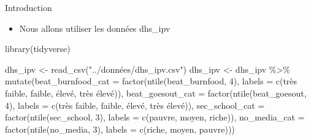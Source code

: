 \documentclass[
  ignorenonframetext,
]{beamer}
\newenvironment{Shaded}{\begin{snugshade}}{\end{snugshade}}
\newcommand{\AttributeTok}[1]{\textcolor[rgb]{0.77,0.63,0.00}{#1}}
\newcommand{\DecValTok}[1]{\textcolor[rgb]{0.00,0.00,0.81}{#1}}
\newcommand{\FunctionTok}[1]{\textcolor[rgb]{0.00,0.00,0.00}{#1}}
\newcommand{\NormalTok}[1]{#1}
\newcommand{\OtherTok}[1]{\textcolor[rgb]{0.56,0.35,0.01}{#1}}
\newcommand{\SpecialCharTok}[1]{\textcolor[rgb]{0.00,0.00,0.00}{#1}}
\newcommand{\StringTok}[1]{\textcolor[rgb]{0.31,0.60,0.02}{#1}}
\providecommand{\tightlist}{%
  \setlength{\itemsep}{0pt}\setlength{\parskip}{0pt}}
\begin{document}
\begin{frame}[fragile]{Introduction}
\protect\hypertarget{introduction-4}{}
\begin{itemize}
\tightlist
\item
  Nous allons utiliser les données dhs\_ipv
\end{itemize}

\begin{Shaded}
\begin{Highlighting}[]
\FunctionTok{library}\NormalTok{(tidyverse)}

\NormalTok{dhs\_ipv }\OtherTok{\textless{}{-}} \FunctionTok{read\_csv}\NormalTok{(}\StringTok{"../données/dhs\_ipv.csv"}\NormalTok{)}
\NormalTok{dhs\_ipv }\OtherTok{\textless{}{-}}
\NormalTok{  dhs\_ipv }\SpecialCharTok{\%\textgreater{}\%} 
  \FunctionTok{mutate}\NormalTok{(}\AttributeTok{beat\_burnfood\_cat =} \FunctionTok{factor}\NormalTok{(}\FunctionTok{ntile}\NormalTok{(beat\_burnfood, }\DecValTok{4}\NormalTok{), }
                                    \AttributeTok{labels =} \FunctionTok{c}\NormalTok{(}\StringTok{\textquotesingle{}très faible\textquotesingle{}}\NormalTok{, }\StringTok{\textquotesingle{}faible\textquotesingle{}}\NormalTok{, }\StringTok{\textquotesingle{}élevé\textquotesingle{}}\NormalTok{, }\StringTok{\textquotesingle{}très élevé\textquotesingle{}}\NormalTok{)),}
         \AttributeTok{beat\_goesout\_cat =} \FunctionTok{factor}\NormalTok{(}\FunctionTok{ntile}\NormalTok{(beat\_goesout, }\DecValTok{4}\NormalTok{), }
                                   \AttributeTok{labels =} \FunctionTok{c}\NormalTok{(}\StringTok{\textquotesingle{}très faible\textquotesingle{}}\NormalTok{, }\StringTok{\textquotesingle{}faible\textquotesingle{}}\NormalTok{, }\StringTok{\textquotesingle{}élevé\textquotesingle{}}\NormalTok{, }\StringTok{\textquotesingle{}très élevé\textquotesingle{}}\NormalTok{)),}
         \AttributeTok{sec\_school\_cat =} \FunctionTok{factor}\NormalTok{(}\FunctionTok{ntile}\NormalTok{(sec\_school, }\DecValTok{3}\NormalTok{), }
                                 \AttributeTok{labels =} \FunctionTok{c}\NormalTok{(}\StringTok{\textquotesingle{}pauvre\textquotesingle{}}\NormalTok{, }\StringTok{\textquotesingle{}moyen\textquotesingle{}}\NormalTok{, }\StringTok{\textquotesingle{}riche\textquotesingle{}}\NormalTok{)),}
         \AttributeTok{no\_media\_cat =} \FunctionTok{factor}\NormalTok{(}\FunctionTok{ntile}\NormalTok{(no\_media, }\DecValTok{3}\NormalTok{), }
                               \AttributeTok{labels =} \FunctionTok{c}\NormalTok{(}\StringTok{\textquotesingle{}riche\textquotesingle{}}\NormalTok{, }\StringTok{\textquotesingle{}moyen\textquotesingle{}}\NormalTok{, }\StringTok{\textquotesingle{}pauvre\textquotesingle{}}\NormalTok{)))}
\end{Highlighting}
\end{Shaded}
\end{frame}
\end{document}
